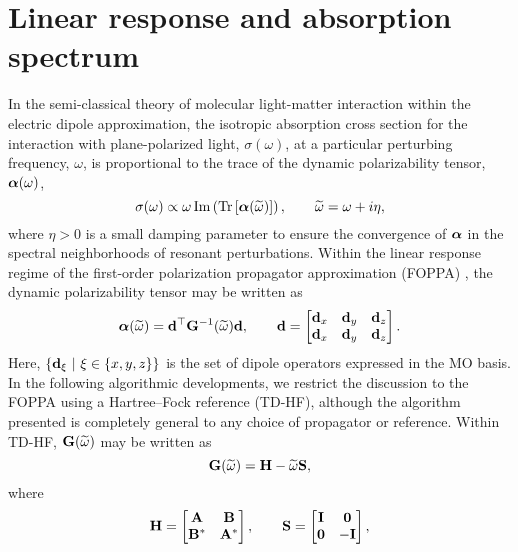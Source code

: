 \section{Linear response and absorption spectrum}
\label{sec:lras}

In the semi-classical theory of molecular light-matter interaction within the electric dipole approximation, the isotropic absorption cross section for the interaction with plane-polarized light, $\sigma(\omega)$, at a particular perturbing frequency, $\omega$, is proportional to the trace of the dynamic polarizability tensor, $\boldsymbol{\alpha}(\omega)$,
\begin{equation}
  \sigma(\omega) \propto \omega \operatorname{Im}\left(\operatorname{Tr}\left[ \boldsymbol{\alpha}(\widetilde{\omega}) \right]\right), \qquad \widetilde{\omega} = \omega + i\eta,
  \label{eq:abs-spectrum}
\end{equation}
where $\eta > 0$ is a small damping parameter to ensure the convergence of $\boldsymbol{\alpha}$ in the spectral neighborhoods of resonant perturbations. Within the linear response regime of the first-order polarization propagator approximation (FOPPA) \cite{Yeager84_33}, the dynamic polarizability tensor may be written as
\begin{equation}
  \boldsymbol{\alpha}(\widetilde{\omega}) = \mathbf{d}^\top \mathbf{G}^{-1}(\widetilde{\omega}) \mathbf{d}, \qquad 
  \mathbf{d} = \begin{bmatrix}
    \mathbf{d}_x & \mathbf{d}_y & \mathbf{d}_z \\
    \mathbf{d}_x & \mathbf{d}_y & \mathbf{d}_z
  \end{bmatrix}.
  \label{eq:polar-tensor}
\end{equation}
Here, $\{ \mathbf{d}_\xi\text{ } \vert\text{ } \xi \in \{ x,y,z \} \}$ is the set of
dipole operators expressed in the MO basis.
In the following algorithmic developments, we restrict the discussion to the FOPPA using a
Hartree--Fock reference (TD-HF), although the algorithm presented is completely
general to any choice of propagator or reference. Within TD-HF, $\mathbf{G}(\widetilde{\omega})$
may be written as
\begin{equation}
  \mathbf{G}(\widetilde{\omega}) = \mathbf{H} - \widetilde{\omega}\mathbf{S},
  \label{eq:defG}
\end{equation}
where
\begin{equation}
  \bH = \begin{bmatrix}
    \bA & \bB \\
    \bB^* & \bA^*
  \end{bmatrix}, \qquad
  \bS = \begin{bmatrix*}
    \bI & \vc 0 \\
    \vc 0 & -\bI
  \end{bmatrix*},
  \label{eq:defH}
\end{equation}
